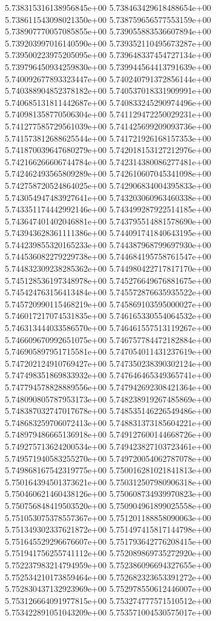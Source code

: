 5.738315316138956845e+00
5.738463429618488654e+00
5.738611543098021350e+00
5.738759656577553159e+00
5.738907770057085855e+00
5.739055883536607894e+00
5.739203997016140590e+00
5.739352110495673287e+00
5.739500223975205095e+00
5.739648337454727134e+00
5.739796450934259830e+00
5.739944564413791639e+00
5.740092677893323447e+00
5.740240791372856144e+00
5.740388904852378182e+00
5.740537018331909991e+00
5.740685131811442687e+00
5.740833245290974496e+00
5.740981358770506304e+00
5.741129472250029231e+00
5.741277585729561039e+00
5.741425699209093736e+00
5.741573812688625544e+00
5.741721926168157353e+00
5.741870039647680279e+00
5.742018153127212976e+00
5.742166266606744784e+00
5.742314380086277481e+00
5.742462493565809289e+00
5.742610607045341098e+00
5.742758720524864025e+00
5.742906834004395833e+00
5.743054947483927641e+00
5.743203060963460338e+00
5.743351174442992146e+00
5.743499287922514185e+00
5.743647401402046881e+00
5.743795514881578690e+00
5.743943628361111386e+00
5.744091741840643195e+00
5.744239855320165233e+00
5.744387968799697930e+00
5.744536082279229738e+00
5.744684195758761547e+00
5.744832309238285362e+00
5.744980422717817170e+00
5.745128536197348978e+00
5.745276649676881675e+00
5.745424763156413484e+00
5.745572876635935522e+00
5.745720990115468219e+00
5.745869103595000027e+00
5.746017217074531835e+00
5.746165330554064532e+00
5.746313444033586570e+00
5.746461557513119267e+00
5.746609670992651075e+00
5.746757784472182884e+00
5.746905897951715581e+00
5.747054011431237619e+00
5.747202124910769427e+00
5.747350238390302124e+00
5.747498351869833932e+00
5.747646465349365741e+00
5.747794578828889556e+00
5.747942692308421364e+00
5.748090805787953173e+00
5.748238919267485869e+00
5.748387032747017678e+00
5.748535146226549486e+00
5.748683259706072413e+00
5.748831373185604221e+00
5.748979486665136918e+00
5.749127600144668726e+00
5.749275713624200534e+00
5.749423827103723461e+00
5.749571940583255270e+00
5.749720054062787078e+00
5.749868167542319775e+00
5.750016281021841813e+00
5.750164394501373621e+00
5.750312507980906318e+00
5.750460621460438126e+00
5.750608734939970823e+00
5.750756848419503520e+00
5.750904961899025558e+00
5.751053075378557367e+00
5.751201188858090063e+00
5.751349302337621872e+00
5.751497415817144798e+00
5.751645529296676607e+00
5.751793642776208415e+00
5.751941756255741112e+00
5.752089869735272920e+00
5.752237983214794959e+00
5.752386096694327655e+00
5.752534210173859464e+00
5.752682323653391272e+00
5.752830437132923969e+00
5.752978550612446007e+00
5.753126664091977815e+00
5.753274777571510512e+00
5.753422891051043209e+00
5.753571004530575017e+00
